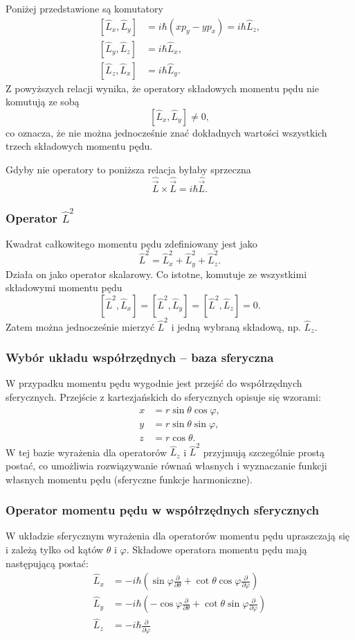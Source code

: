Poniżej przedstawione są komutatory
$$
\begin{aligned}
  [\hat{L}_x, \hat{L}_y] &= i\hbar(xp_y - yp_x) = i \hbar \hat{L}_z, \\
  [\hat{L}_y, \hat{L}_z] &= i \hbar \hat{L}_x, \\
  [\hat{L}_z, \hat{L}_x] &= i \hbar \hat{L}_y.
\end{aligned}
$$
Z powyższych relacji wynika, że operatory składowych momentu pędu nie komutują ze sobą
$$
[\hat{L}_x, \hat{L}_y] \neq 0,
$$
co oznacza, że nie można jednocześnie znać dokładnych wartości wszystkich trzech składowych momentu pędu.

Gdyby nie operatory to poniższa relacja byłaby sprzeczna
$$
\hat{\vec{L}} \times \hat{\vec{L}} = i\hbar \hat{\vec{L}}.
$$

\subsubsection*{Operator $\hat{L}^2$}
Kwadrat całkowitego momentu pędu zdefiniowany jest jako
$$
\hat{L}^2 = \hat{L}_x^2 + \hat{L}_y^2 + \hat{L}_z^2.
$$
Działa on jako operator skalarowy. Co istotne, komutuje ze wszystkimi składowymi momentu pędu
$$
[\hat{L}^2, \hat{L}_x] = [\hat{L}^2, \hat{L}_y] = [\hat{L}^2, \hat{L}_z] = 0.
$$
Zatem można jednocześnie mierzyć $\hat{L}^2$ i jedną wybraną składową, np. $\hat{L}_z$.

\subsubsection*{Wybór układu współrzędnych -- baza sferyczna}
W przypadku momentu pędu wygodnie jest przejść do współrzędnych sferycznych. Przejście z kartezjańskich do sferycznych opisuje się wzorami:
$$
\begin{aligned}
x &= r \sin \theta \cos \varphi, \\
y &= r \sin \theta \sin \varphi, \\
z &= r \cos \theta.
\end{aligned}
$$
W tej bazie wyrażenia dla operatorów $\hat{L}_z$ i $\hat{L}^2$ przyjmują szczególnie prostą postać, co umożliwia rozwiązywanie równań własnych i wyznaczanie funkcji własnych momentu pędu (sferyczne funkcje harmoniczne).


\subsubsection*{Operator momentu pędu w współrzędnych sferycznych}
W układzie sferycznym wyrażenia dla operatorów momentu pędu upraszczają się i zależą tylko od kątów $\theta$ i $\varphi$. Składowe operatora momentu pędu mają następującą postać:
$$
\begin{aligned}
\hat{L}_x &= -i\hbar \left( \sin\varphi \frac{\partial}{\partial\theta} + \cot\theta \cos\varphi \frac{\partial}{\partial\varphi} \right) \\
\hat{L}_y &= -i\hbar \left( -\cos\varphi \frac{\partial}{\partial\theta} + \cot\theta \sin\varphi \frac{\partial}{\partial\varphi} \right) \\
\hat{L}_z &= -i\hbar \frac{\partial}{\partial\varphi}
\end{aligned}
$$

